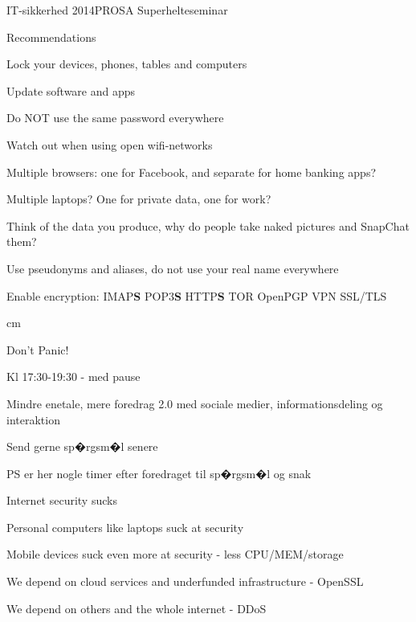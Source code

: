 \documentclass[20pt,landscape,a4paper,footrule]{foils}
\begin{document}


\mytitlepage
{IT-sikkerhed 2014}{PROSA Superhelteseminar}



Recommendations 
\begin{list2}
\item Lock your devices, phones, tables and computers
\item Update software and apps
\item Do NOT use the same password everywhere
\item Watch out when using open wifi-networks
\item Multiple browsers: one for Facebook, and separate for home banking apps?
\item Multiple laptops? One for private data, one for work?
\item Think of the data you produce, why do people take naked pictures and SnapChat them?
\item Use pseudonyms and aliases, do not use your real name everywhere
\item Enable encryption: IMAP{\bf S} POP3{\bf S}
  HTTP{\bf S} TOR OpenPGP VPN SSL/TLS
\end{list2}



 cm

\centerline{\color{titlecolor}\LARGE Don't Panic!}

\begin{list1}
\item Kl 17:30-19:30 - med pause
\item Mindre enetale, mere foredrag 2.0 med sociale medier, informationsdeling og interaktion
\end{list1}
\centerline{Send gerne sp�rgsm�l senere}
{\footnotesize PS er her nogle timer efter foredraget til sp�rgsm�l og snak}




\begin{list1}
\item Internet security sucks
\item Personal computers like laptops suck at security
\item Mobile devices suck even more at security - less CPU/MEM/storage
\item We depend on cloud services and underfunded infrastructure - OpenSSL
\item We depend on others and the whole internet - DDoS
\end{list1}
\end{document}
